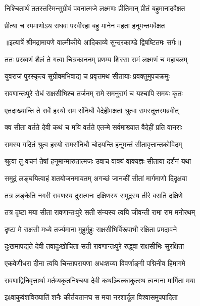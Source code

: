\twolineshloka
{निश्चितार्थं ततस्तस्मिन्सुग्रीवं पवनात्मजे}
{लक्ष्मणः प्रीतिमान् प्रीतं बहुमानादवैक्षत} %

\twolineshloka
{प्रीत्या च रममाणोऽथ राघवः परवीरहा}
{बहु मानेन महता हनूमन्तमवैक्षत} %


{॥इत्यार्षे श्रीमद्रामायणे वाल्मीकीये आदिकाव्ये सुन्दरकाण्डे द्विषष्टितमः सर्गः॥}


\twolineshloka
{ततः प्रस्रवणं शैलं ते गत्वा चित्रकाननम्}
{प्रणम्य शिरसा रामं लक्ष्मणं च महाबलम्} %

\twolineshloka
{युवराजं पुरस्कृत्य सुग्रीवमभिवाद्य च}
{प्रवृत्तमथ सीतायाः प्रवक्तुमुपचक्रमुः} %

\twolineshloka
{रावणान्तःपुरे रोधं राक्षसीभिश्च तर्जनम्}
{रामे समनुरागं च यश्चापि समयः कृतः} %

\twolineshloka
{एतदाख्यान्ति ते सर्वे हरयो राम संनिधौ}
{वैदेहीमक्षतां श्रुत्वा रामस्तूत्तरमब्रवीत्} %

\twolineshloka
{क्व सीता वर्तते देवी कथं च मयि वर्तते}
{एतन्मे सर्वमाख्यात वैदेहीं प्रति वानराः} %

\twolineshloka
{रामस्य गदितं श्रुत्व हरयो रामसंनिधौ}
{चोदयन्ति हनूमन्तं सीतावृत्तान्तकोविदम्} %

\twolineshloka
{श्रुत्वा तु वचनं तेषां हनूमान्मारुतात्मजः}
{उवाच वाक्यं वाक्यज्ञः सीताया दर्शनं यथा} %

\twolineshloka
{समुद्रं लङ्घयित्वाहं शतयोजनमायतम्}
{अगच्छं जानकीं सीतां मार्गमाणो दिदृक्षया} %

\twolineshloka
{तत्र लङ्केति नगरी रावणस्य दुरात्मनः}
{दक्षिणस्य समुद्रस्य तीरे वसति दक्षिणे} %

\twolineshloka
{तत्र दृष्टा मया सीता रावणान्तःपुरे सती}
{संन्यस्य त्वयि जीवन्ती रामा राम मनोरथम्} %

\twolineshloka
{दृष्टा मे राक्षसी मध्ये तर्ज्यमाना मुहुर्मुहुः}
{राक्षसीभिर्विरूपाभी रक्षिता प्रमदावने} %

\twolineshloka
{दुःखमापद्यते देवी तवादुःखोचिता सती}
{रावणान्तःपुरे रुद्ध्वा राक्षसीभिः सुरक्षिता} %

\twolineshloka
{एकवेणीधरा दीना त्वयि चिन्तापरायणा}
{अधःशय्या विवर्णाङ्गी पद्मिनीव हिमागमे} %

\twolineshloka
{रावणाद्विनिवृत्तार्था मर्तव्यकृतनिश्चया}
{देवी कथञ्चित्काकुत्स्थ त्वन्मना मार्गिता मया} %

\twolineshloka
{इक्ष्वाकुवंशविख्यातिं शनैः कीर्तयतानघ}
{स मया नरशार्दूल विश्वासमुपपादिता} %

